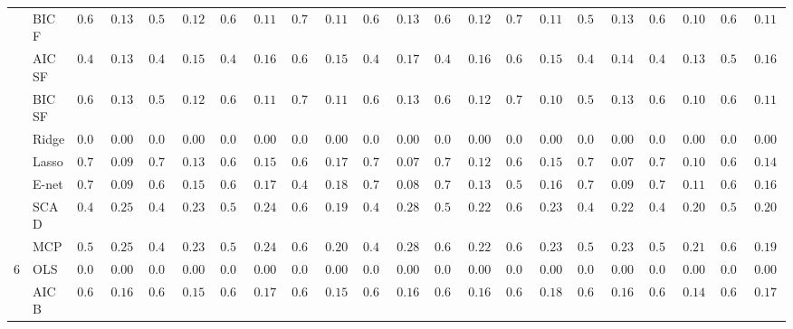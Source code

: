 \begin{tabular}{p{0.2cm}p{1cm}|p{0.6cm}p{0.6cm}|p{0.6cm}p{0.6cm}p{0.6cm}p{0.6cm}p{0.6cm}p{0.6cm}|p{0.6cm}p{0.6cm}p{0.6cm}p{0.6cm}p{0.6cm}p{0.6cm}|p{0.6cm}p{0.6cm}p{0.6cm}p{0.6cm}p{0.6cm}p{0.6cm}}
 & BIC F  & $0.616$ & $0.1383$ & $0.588$ & $0.1266$ & $0.640$ & $0.1172$ & $0.720$ & $0.1101$ & $0.636$ & $0.1345$ & $0.650$ & $0.1251$ & $0.732$ & $0.1145$ & $0.598$ & $0.1318$ & $0.626$ & $0.1011$ & $0.664$ & $0.1133$ \\
 & AIC SF  & $0.432$ & $0.1355$ & $0.454$ & $0.1527$ & $0.496$ & $0.1669$ & $0.614$ & $0.1589$ & $0.432$ & $0.1746$ & $0.494$ & $0.1644$ & $0.658$ & $0.1539$ & $0.432$ & $0.1497$ & $0.498$ & $0.1318$ & $0.586$ & $0.1664$ \\
 & BIC SF  & $0.616$ & $0.1383$ & $0.588$ & $0.1266$ & $0.640$ & $0.1172$ & $0.720$ & $0.1101$ & $0.636$ & $0.1345$ & $0.650$ & $0.1251$ & $0.738$ & $0.1090$ & $0.598$ & $0.1318$ & $0.626$ & $0.1011$ & $0.664$ & $0.1133$ \\
 & Ridge  & $0.000$ & $0.0000$ & $0.000$ & $0.0000$ & $0.000$ & $0.0000$ & $0.000$ & $0.0000$ & $0.000$ & $0.0000$ & $0.000$ & $0.0000$ & $0.000$ & $0.0000$ & $0.000$ & $0.0000$ & $0.000$ & $0.0000$ & $0.000$ & $0.0000$ \\
 & Lasso  & $0.762$ & $0.0930$ & $0.720$ & $0.1363$ & $0.654$ & $0.1553$ & $0.614$ & $0.1735$ & $0.774$ & $0.0787$ & $0.740$ & $0.1287$ & $0.658$ & $0.1565$ & $0.774$ & $0.0733$ & $0.746$ & $0.1096$ & $0.690$ & $0.1432$ \\
 & E-net  & $0.760$ & $0.0943$ & $0.682$ & $0.1533$ & $0.618$ & $0.1777$ & $0.472$ & $0.1832$ & $0.770$ & $0.0823$ & $0.732$ & $0.1340$ & $0.562$ & $0.1698$ & $0.762$ & $0.0930$ & $0.740$ & $0.1189$ & $0.642$ & $0.1689$ \\
 & SCAD  & $0.492$ & $0.2549$ & $0.426$ & $0.2338$ & $0.516$ & $0.2415$ & $0.676$ & $0.1965$ & $0.466$ & $0.2801$ & $0.560$ & $0.2238$ & $0.648$ & $0.2380$ & $0.466$ & $0.2221$ & $0.492$ & $0.2097$ & $0.582$ & $0.2091$ \\
 & MCP  & $0.542$ & $0.2531$ & $0.478$ & $0.2308$ & $0.564$ & $0.2402$ & $0.664$ & $0.2028$ & $0.496$ & $0.2835$ & $0.610$ & $0.2209$ & $0.636$ & $0.2351$ & $0.518$ & $0.2311$ & $0.552$ & $0.2110$ & $0.626$ & $0.1900$ \\\hline
6 & OLS  & $0.000$ & $0.0000$ & $0.000$ & $0.0000$ & $0.000$ & $0.0000$ & $0.000$ & $0.0000$ & $0.000$ & $0.0000$ & $0.000$ & $0.0000$ & $0.000$ & $0.0000$ & $0.000$ & $0.0000$ & $0.000$ & $0.0000$ & $0.000$ & $0.0000$ \\
 & AIC B  & $0.616$ & $0.1674$ & $0.620$ & $0.1595$ & $0.602$ & $0.1764$ & $0.634$ & $0.1584$ & $0.616$ & $0.1698$ & $0.616$ & $0.1600$ & $0.616$ & $0.1879$ & $0.604$ & $0.1608$ & $0.632$ & $0.1442$ & $0.602$ & $0.1717$ \\

\end{tabular}
